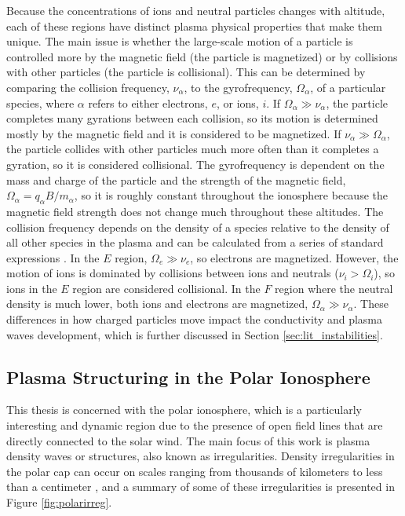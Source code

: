 Because the concentrations of ions and neutral particles changes with altitude, each of these regions have distinct plasma physical properties that make them unique.  The main issue is whether the large-scale motion of a particle is controlled more by the magnetic field (the particle is magnetized) or by collisions with other particles (the particle is collisional).  This can be determined by comparing the collision frequency, \(\nu_\alpha\), to the gyrofrequency, \(\Omega_\alpha\), of a particular species, where \(\alpha\) refers to either electrons, \(e\), or ions, \(i\).  If \(\Omega_\alpha \gg \nu_\alpha\), the particle completes many gyrations between each collision, so its motion is determined mostly by the magnetic field and it is considered to be magnetized.  If \(\nu_\alpha \gg \Omega_\alpha\), the particle collides with other particles much more often than it completes a gyration, so it is considered collisional.  The gyrofrequency is dependent on the mass and charge of the particle and the strength of the magnetic field, \(\Omega_\alpha = q_\alpha B/m_\alpha\), so it is roughly constant throughout the ionosphere because the magnetic field strength does not change much throughout these altitudes.  The collision frequency depends on the density of a species relative to the density of all other species in the plasma and can be calculated from a series of standard expressions \citep{Schunk1980,Schunk2009}.  In the \(E\) region, \(\Omega_e \gg \nu_e\), so electrons are magnetized.  However, the motion of ions is dominated by collisions between ions and neutrals (\(\nu_i > \Omega_i\)), so ions in the \(E\) region are considered collisional.  In the \(F\) region where the neutral density is much lower, both ions and electrons are magnetized, \(\Omega_\alpha \gg \nu_\alpha\).  These differences in how charged particles move impact the conductivity and plasma waves development, which is further discussed in Section \ref{sec:lit_instabilities}.

\subsection{Plasma Structuring in the Polar Ionosphere}
\label{sec:polar_structure}

This thesis is concerned with the polar ionosphere, which is a particularly interesting and dynamic region due to the presence of open field lines that are directly connected to the solar wind.  The main focus of this work is plasma density waves or structures, also known as irregularities.  Density irregularities in the polar cap can occur on scales ranging from thousands of kilometers to less than a centimeter \citep{Tsunoda1988}, and a summary of some of these irregularities is presented in Figure \ref{fig:polarirreg}.  

